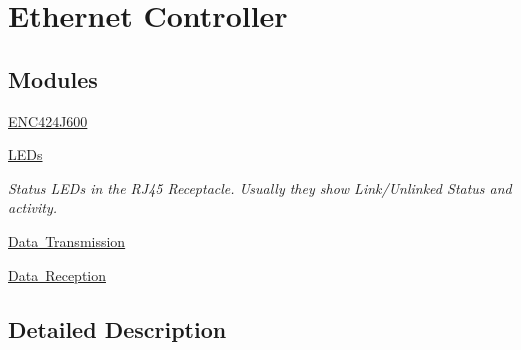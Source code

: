 \hypertarget{group__ethernet_controller}{}\section{Ethernet Controller}
\label{group__ethernet_controller}
\subsection*{Modules}
\begin{DoxyCompactItemize}
\item 
\mbox{\hyperlink{group__enc424j600__module}{E\+N\+C424\+J600}}
\item 
\mbox{\hyperlink{group__leds}{L\+E\+Ds}}
\begin{DoxyCompactList}\small\item\em Status L\+E\+Ds in the R\+J45 Receptacle. Usually they show Link/\+Unlinked Status and activity. \end{DoxyCompactList}\item 
\mbox{\hyperlink{group__data__transmission}{Data Transmission}}
\item 
\mbox{\hyperlink{group__data__reception}{Data Reception}}
\end{DoxyCompactItemize}


\subsection{Detailed Description}
